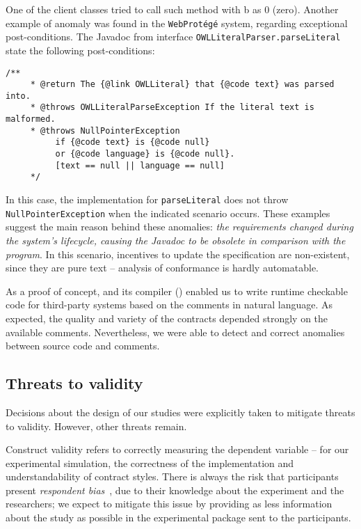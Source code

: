 One of the client classes tried to call such method with b as $0$ (zero). Another example of anomaly was found in the \texttt{WebProt\'{e}g\'{e}} system, regarding exceptional post-conditions. 
The Javadoc from interface \texttt{OWLLiteralParser.parseLiteral} state the following post-conditions:

\begin{lstlisting}[basicstyle=\footnotesize\ttfamily,name=figxpi, frame=lines, mathescape=true]
 /**
     * @return The {@link OWLLiteral} that {@code text} was parsed into.
     * @throws OWLLiteralParseException If the literal text is malformed.
     * @throws NullPointerException 
          if {@code text} is {@code null} 
          or {@code language} is {@code null}. 
          [text == null || language == null]
     */
\end{lstlisting}

In this case, the implementation for \texttt{parseLiteral} does not throw \texttt{NullPointerException} when the indicated scenario occurs.
These examples suggest the main reason behind these anomalies: \emph{the requirements changed during the system's lifecycle, causing the Javadoc to be obsolete in comparison with the program}. In this scenario, incentives to update the specification are non-existent, since they are pure text -- analysis of conformance is hardly automatable. 

As a proof of concept, \contractjdoc{} and its compiler (\contractjdocCompiler{}) enabled us to write runtime
checkable code for third-party systems based on the comments in natural language.
As expected, the quality and variety of the contracts depended strongly on the available comments. Nevertheless, we were able to
detect and correct anomalies between source code and comments.

\subsection{Threats to validity}
\label{sec:CaseStudyThreats}

Decisions about the design of our studies were explicitly taken to mitigate threats to validity. However, other threats remain.

Construct validity refers to correctly measuring the
dependent variable -- for our experimental simulation, the correctness of the implementation and understandability of contract styles.
There is always the risk that participants present \emph{respondent bias}~\cite{refSurvey}, due to their knowledge about the experiment and the researchers; we expect to mitigate this issue by providing as less information about the study as possible in the experimental package sent to the participants.

